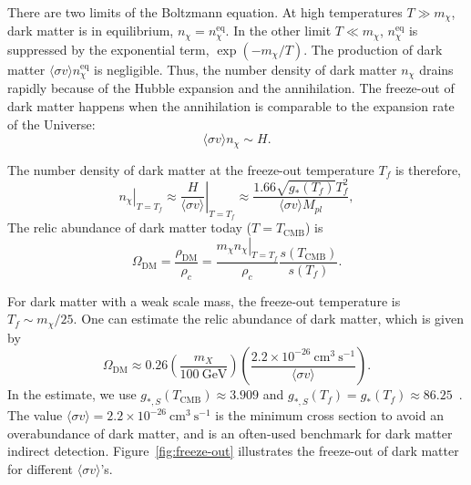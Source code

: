 \documentclass[doublespace,nopageskip]{VTthesis}
\newcommand{\sigmav}{\langle\sigma v\rangle}
\begin{document}
There are two limits of the Boltzmann equation. At high temperatures $T \gg m_\chi$, dark matter is in equilibrium, $n_\chi = n_\chi^{\mathrm{eq}}$. In the other limit $T \ll m_\chi$, $n_\chi^{\mathrm{eq}}$ is suppressed by the exponential term, $\exp(-m_\chi/T)$. The production of dark matter $\langle\sigma v\rangle n_\chi^{\mathrm{eq}}$ is negligible. Thus, the number density of dark matter $n_\chi$ drains rapidly because of the Hubble expansion and the annihilation. The freeze-out of dark matter happens when the annihilation is comparable to the expansion rate of the Universe:
\begin{equation}
    \langle\sigma v\rangle n_\chi \sim H.
\end{equation}

The number density of dark matter at the freeze-out temperature $T_f$ is therefore,
\begin{equation}
    \left.n_\chi\right|_{T = T_f} \approx \left.\frac{H}{\langle\sigma v\rangle}\right|_{T = T_f} \approx \frac{1.66\sqrt{g_*(T_f)}T_f^2}{\langle\sigma v\rangle M_{pl}},
\end{equation}
The relic abundance of dark matter today ($T=T_\mathrm{CMB}$) is
\begin{equation}
    \Omega_\mathrm{DM} = \frac{\rho_\mathrm{DM}}{\rho_c} = \frac{\left. m_\chi n_\chi\right|_{T = T_f}}{\rho_c}\frac{s(T_\mathrm{CMB})}{s(T_f)}.
\end{equation}

For dark matter with a weak scale mass, the freeze-out temperature is $T_f \sim m_\chi/25$. One can estimate the relic abundance of dark matter, which is given by
\begin{equation}
    \Omega_\mathrm{DM} \approx 0.26 \left( \frac{m_X}{100\ \mathrm{GeV}} \right) \left( \frac{2.2\times 10^{-26}\ \mathrm{cm}^3\ \mathrm{s}^{-1}}{\langle\sigma v\rangle} \right).
\end{equation}
In the estimate, we use $g_{*,S}(T_\mathrm{CMB}) \approx 3.909$ and $g_{*,S}(T_f) = g_{*}(T_f) \approx 86.25$~\cite{2016Galax...4...78H}. The value $\langle\sigma v\rangle = 2.2\times 10^{-26}\ \mathrm{cm}^3\ \mathrm{s}^{-1}$ is the minimum cross section to avoid an overabundance of dark matter, and is an often-used benchmark for dark matter indirect detection. {Figure~\ref{fig:freeze-out} illustrates the freeze-out of dark matter for different $\sigmav$'s.}
\end{document}
